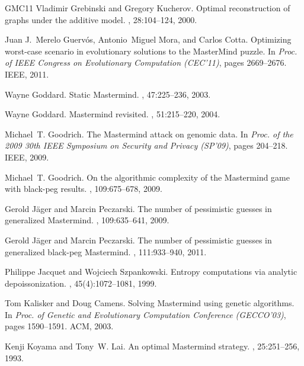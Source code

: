 \documentclass[english,a4paper,11pt]{article}
\begin{document}
\begin{thebibliography}{GMC11}
Vladimir Grebinski and Gregory Kucherov.
\newblock Optimal reconstruction of graphs under the additive model.
, 28:104--124, 2000.

Juan J.~Merelo Guerv{\'o}s, Antonio~Miguel Mora, and Carlos Cotta.
\newblock Optimizing worst-case scenario in evolutionary solutions to the
  {M}aster{M}ind puzzle.
\newblock In {\em Proc. of IEEE Congress on Evolutionary Computation (CEC'11)},
  pages 2669--2676. IEEE, 2011.

Wayne Goddard.
\newblock Static {M}astermind.
, 47:225--236, 2003.

Wayne Goddard.
\newblock Mastermind revisited.
, 51:215--220, 2004.

Michael~T. Goodrich.
\newblock The {M}astermind attack on genomic data.
\newblock In {\em Proc. of the 2009 30th IEEE Symposium on Security and Privacy
  (SP'09)}, pages 204--218. IEEE, 2009.

Michael~T. Goodrich.
\newblock On the algorithmic complexity of the {M}astermind game with black-peg
  results.
, 109:675--678, 2009.

Gerold J{\"a}ger and Marcin Peczarski.
\newblock The number of pessimistic guesses in generalized {M}astermind.
, 109:635--641, 2009.

Gerold J{\"a}ger and Marcin Peczarski.
\newblock The number of pessimistic guesses in generalized black-peg
  {M}astermind.
, 111:933--940, 2011.

Philippe Jacquet and Wojciech Szpankowski.
\newblock Entropy computations via analytic depoissonization.
, 45(4):1072--1081,
  1999.

Tom Kalisker and Doug Camens.
\newblock Solving {M}astermind using genetic algorithms.
\newblock In {\em Proc. of Genetic and Evolutionary Computation Conference
  (GECCO'03)}, pages 1590--1591. ACM, 2003.

Kenji Koyama and Tony~W. Lai.
\newblock An optimal {M}astermind strategy.
, 25:251--256, 1993.


\end{thebibliography}
\end{document}
